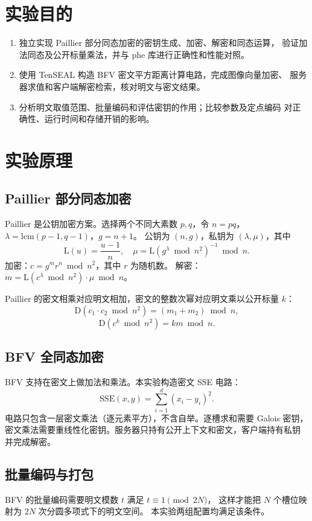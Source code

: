 \documentclass{SYSUReport}
\date{2026 年 10 月 29 日}
\begin{document}
\cover
\thispagestyle{empty}
\clearpage
\tableofcontents
\clearpage
{}
\setcounter{page}{1}

\section{实验目的}

\begin{enumerate}
  \item 独立实现 Paillier 部分同态加密的密钥生成、加密、解密和同态运算，
        验证加法同态及公开标量乘法，并与 phe 库进行正确性和性能对照。
  \item 使用 TenSEAL 构造 BFV 密文平方距离计算电路，完成图像向量加密、
        服务器求值和客户端解密检索，核对明文与密文结果。
  \item 分析明文取值范围、批量编码和评估密钥的作用；比较参数及定点编码
        对正确性、运行时间和存储开销的影响。
\end{enumerate}

\section{实验原理}

\subsection{Paillier 部分同态加密}
Paillier 是公钥加密方案。选择两个不同大素数 $p, q$，令 $n = pq$，
$\lambda = \mathrm{lcm}(p-1, q-1)$，$g = n+1$。
公钥为 $(n, g)$，私钥为 $(\lambda, \mu)$，其中
$$\mathrm{L}(u) = \frac{u-1}{n},\quad
\mu = \mathrm{L}(g^{\lambda} \bmod n^2)^{-1} \bmod n.$$
加密：$c = g^{m} r^{n} \bmod n^2$，其中 $r$ 为随机数。
解密：$m = \mathrm{L}(c^{\lambda} \bmod n^2) \cdot \mu \bmod n$。

Paillier 的密文相乘对应明文相加，密文的整数次幂对应明文乘以公开标量 $k$：
$$\mathrm{D}(c_1 \cdot c_2 \bmod n^2) = (m_1 + m_2) \bmod n,$$
$$\mathrm{D}(c^k \bmod n^2) = km \bmod n.$$

\subsection{BFV 全同态加密}
BFV 支持在密文上做加法和乘法。本实验构造密文 SSE 电路：
$$\mathrm{SSE}(x, y) = \sum_{i=1}^{d}(x_i - y_i)^2.$$
电路只包含一层密文乘法（逐元素平方），不含自举。逐槽求和需要 Galois 密钥，
密文乘法需要重线性化密钥。服务器只持有公开上下文和密文，客户端持有私钥
并完成解密。

\subsection{批量编码与打包}
BFV 的批量编码需要明文模数 $t$ 满足 $t \equiv 1 \pmod{2N}$，
这样才能把 $N$ 个槽位映射为 $2N$ 次分圆多项式下的明文空间。
本实验两组配置均满足该条件。
\end{document}
